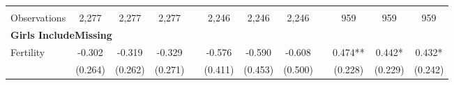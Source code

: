 \begin{landscape}
\begin{table}[htpb!]
\begin{center}
\begin{tabular}{lcccp{2mm}cccp{2mm}ccc}
\begin{footnotesize}\end{footnotesize}&\begin{footnotesize}\end{footnotesize}&\begin{footnotesize}\end{footnotesize}&\begin{footnotesize}\end{footnotesize}&\begin{footnotesize}\end{footnotesize}&\begin{footnotesize}\end{footnotesize}&\begin{footnotesize}\end{footnotesize}&\begin{footnotesize}\end{footnotesize}&\begin{footnotesize}\end{footnotesize}&\begin{footnotesize}\end{footnotesize}&\begin{footnotesize}\end{footnotesize}&\begin{footnotesize}\end{footnotesize}\\Observations&2,277&2,277&2,277&&2,246&2,246&2,246&&959&959&959\\
\multicolumn{12}{l}{\textbf{Girls IncludeMissing}}\\ 
Fertility&-0.302&-0.319&-0.329&&-0.576&-0.590&-0.608&&0.474**&0.442*&0.432*\\
&(0.264)&(0.262)&(0.271)&&(0.411)&(0.453)&(0.500)&&(0.228)&(0.229)&(0.242)\\

\end{tabular}
\end{center}
\end{table}
\end{landscape}
